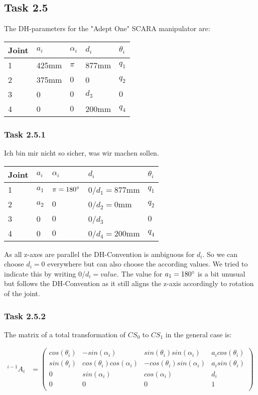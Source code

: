 \subsection*{Task 2.5}
The DH-parameters for the "Adept One" SCARA manipulator are:
\begin{center}
	\begin{tabular}{ | l | l | l | l | l |}
		\hline
		Joint & $a_{i}$ & $\alpha_{i}$ & $d_i$ & $\theta_i$ \\ \hline
		1 & 425mm & $\pi$ & 877mm & $q_1$\\ \hline
		2 & 375mm & $0$ & 0 & $q_2$\\ \hline
		3 & 0 & $0$ & $d_3$ & $0$\\ \hline
		4 & 0 & $0$ & 200mm & $q_4$\\ \hline
	\end{tabular}
\end{center}
\subsubsection*{Task 2.5.1}
Ich bin mir nicht so sicher, was wir machen sollen.
\begin{center}
	\begin{tabular}{ | l | l | l | l | l |}
		\hline
		Joint & $a_{i}$ & $\alpha_{i}$ & $d_i$ & $\theta_i$ \\ \hline
		1 & $a_1$ & $\pi = 180\degree$ & 0/$d_1=877$mm & $q_1$\\ \hline
		2 & $a_2$ & $0$ & 0/$d_2=0$mm & $q_2$\\ \hline
		3 & 0 & $0$ & 0/$d_3$ & $0$\\ \hline
		4 & 0 & $0$ & 0/$d_4=200$mm & $q_4$\\ \hline
	\end{tabular}
\end{center}
As all z-axes are parallel the DH-Convention is ambiguous for $d_i$.
So we can choose $d_i = 0$ everywhere but can also choose the according values. We tried to indicate this by writing 0/$d_i=value$. The value for $a_1 = 180\degree$ is a bit unusual but follows the DH-Convention as it still aligns the z-axis accordingly to rotation of the joint.
\subsubsection*{Task 2.5.2}
The matrix of a total transformation of $CS_0$ to $CS_1$ in the general case is:

\begin{align*}
^{i-1}A_i &= 
\begin{pmatrix}
cos(\theta_i) & -sin(\alpha_i) & sin(\theta_i)sin(\alpha_i) & a_icos(\theta_i) \\
sin(\theta_i) & cos(\theta_i)cos(\alpha_i) & -cos(\theta_i)sin(\alpha_i) & a_isin(\theta_i) \\
0 & sin(\alpha_i) & cos(\alpha_i) & d_i \\
0 & 0 & 0 & 1 \\
\end{pmatrix}
\end{align*}

